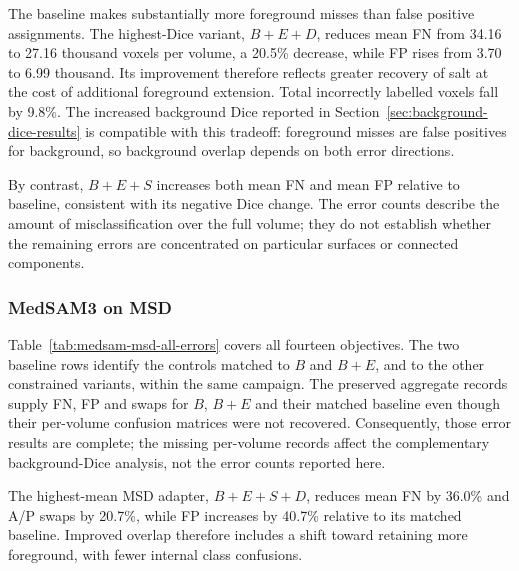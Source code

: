 \documentclass[12pt,a4paper]{article}
\begin{document}
The baseline makes substantially more foreground misses than false
positive assignments. The highest-Dice variant, $B+E+D$, reduces
mean FN from 34.16 to 27.16 thousand voxels per volume, a 20.5\%
decrease, while FP rises from 3.70 to 6.99 thousand. Its improvement
therefore reflects greater recovery of salt at the cost of additional
foreground extension. Total incorrectly labelled voxels fall by 9.8\%.
The increased background Dice reported in
Section~\ref{sec:background-dice-results} is compatible with this
tradeoff: foreground misses are false positives for background,
so background overlap depends on both error directions.

By contrast, $B+E+S$ increases both mean FN and mean FP relative
to baseline, consistent with its negative Dice change. The error
counts describe the amount of misclassification over the full volume;
they do not establish whether the remaining errors are concentrated
on particular surfaces or connected components.

\subsubsection{MedSAM3 on MSD}

Table~\ref{tab:medsam-msd-all-errors} covers all fourteen objectives.
The two baseline rows identify the controls matched to $B$ and $B+E$,
and to the other constrained variants, within the same campaign.
The preserved aggregate records supply FN, FP and swaps for $B$, $B+E$
and their matched baseline even though their per-volume confusion
matrices were not recovered. Consequently, those error results are
complete; the missing per-volume records affect the complementary
background-Dice analysis, not the error counts reported here.

The highest-mean MSD adapter, $B+E+S+D$, reduces mean FN by 36.0\%
and A/P swaps by 20.7\%, while FP increases by 40.7\% relative to its
matched baseline. Improved overlap therefore includes a shift toward
retaining more foreground, with fewer internal class confusions.
\end{document}
